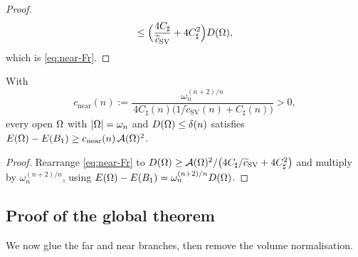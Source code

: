 \begin{proof}
\begin{align*}
    \le\Bigl(\frac{4C_\sharp}{\widetilde c_{\mathrm{SV}}}+4C_\sharp^2\Bigr)D(\Omega),
\end{align*}
which is \eqref{eq:near-Fr}.
\end{proof}

\begin{corollary}\label{cor:near}
With
\begin{equation}\label{eq:cnear}
   c_{\mathrm{near}}(n):=
   \frac{\omega_n^{(n+2)/n}}
        {\,4C_\sharp(n)\bigl(1/\widetilde c_{\mathrm{SV}}(n)+C_\sharp(n)\bigr)}>0,
\end{equation}
every open $\Omega$ with $\left|\Omega\right|=\omega_n$ and $D(\Omega)\le\delta(n)$
satisfies $E(\Omega)-E(B_1)\ge c_{\mathrm{near}}(n)\,\mathcal A(\Omega)^2$.
\end{corollary}

\begin{proof}
Rearrange \eqref{eq:near-Fr} to
$D(\Omega)\ge\mathcal A(\Omega)^2/\bigl(4C_\sharp/\widetilde c_{\mathrm{SV}}
+4C_\sharp^2\bigr)$ and multiply by $\omega_n^{(n+2)/n}$, using
$E(\Omega)-E(B_1)=\omega_n^{(n+2)/n}D(\Omega)$.
\end{proof}

\subsection{Proof of the global theorem}\label{ssec:global-proof}

We now glue the far and near branches, then remove the volume
normalisation.

